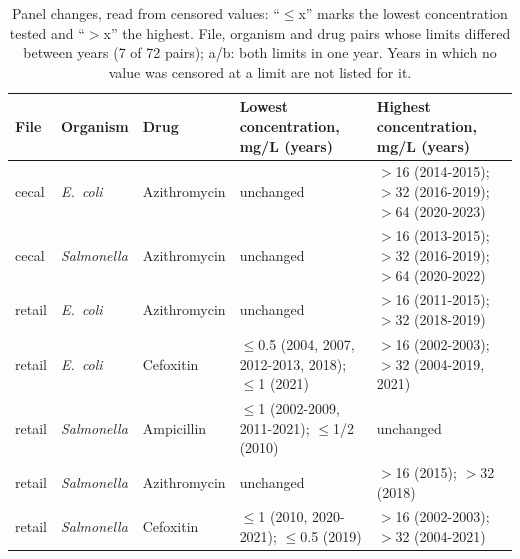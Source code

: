 \begin{table}[h]
\centering
\scriptsize
\begin{tabular}{lllp{6.5cm}p{6.5cm}}
\toprule
File & Organism & Drug & Lowest concentration, mg/L (years) & Highest concentration, mg/L (years) \\
\midrule
cecal & \textit{E.~coli} & Azithromycin & unchanged & $>$16 (2014-2015); $>$32 (2016-2019); $>$64 (2020-2023) \\
cecal & \textit{Salmonella} & Azithromycin & unchanged & $>$16 (2013-2015); $>$32 (2016-2019); $>$64 (2020-2022) \\
retail & \textit{E.~coli} & Azithromycin & unchanged & $>$16 (2011-2015); $>$32 (2018-2019) \\
retail & \textit{E.~coli} & Cefoxitin & $\leq$0.5 (2004, 2007, 2012-2013, 2018); $\leq$1 (2021) & $>$16 (2002-2003); $>$32 (2004-2019, 2021) \\
retail & \textit{Salmonella} & Ampicillin & $\leq$1 (2002-2009, 2011-2021); $\leq$1/2 (2010) & unchanged \\
retail & \textit{Salmonella} & Azithromycin & unchanged & $>$16 (2015); $>$32 (2018) \\
retail & \textit{Salmonella} & Cefoxitin & $\leq$1 (2010, 2020-2021); $\leq$0.5 (2019) & $>$16 (2002-2003); $>$32 (2004-2021) \\
\bottomrule
\end{tabular}
\caption{Panel changes, read from censored values: ``$\leq$x'' marks the lowest concentration tested and ``$>$x'' the highest. File, organism and drug pairs whose limits differed between years (7 of 72 pairs); a/b: both limits in one year. Years in which no value was censored at a limit are not listed for it.}
\end{table}

